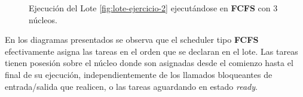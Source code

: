 \begin{figure}[h!t]
  \centering
  \caption{Ejecución del Lote \ref{fig:lote-ejercicio-2} ejecutándose en \textbf{FCFS} con 3 núcleos.}
  \label{fig:ejercicio-2-3-nucleos}
\end{figure}

En los diagramas presentados se observa que el scheduler tipo \textbf{FCFS} efectivamente asigna las tareas en el orden que se declaran en el lote. Las tareas tienen posesión sobre el núcleo donde son asignadas desde el comienzo hasta el final de su ejecución, independientemente de los llamados bloqueantes de entrada/salida que realicen, o las tareas aguardando en estado \textit{ready}.